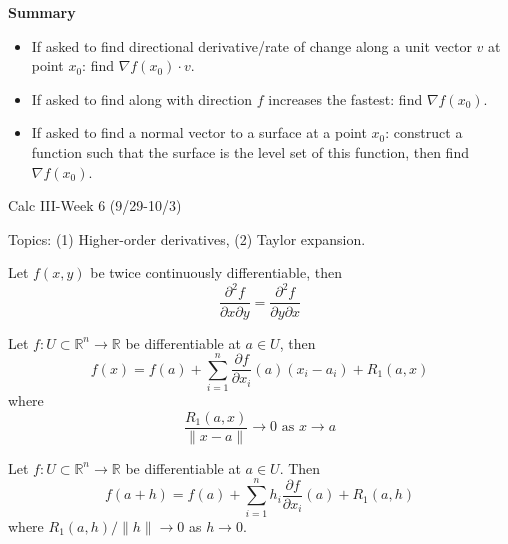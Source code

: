 \documentclass[openany]{book}
\newcommand{\R}{\mathbb{R}}
\begin{document}
\noindent 
\textbf{Summary}
\begin{itemize}
    \item If asked to find directional derivative/rate of change along a unit vector $v$ at point $x_0$: find $\nabla f(x_0)\cdot v$.
    \item If asked to find along with direction $f$ increases the fastest: find $\nabla f(x_0)$.
    \item If asked to find a normal vector to a surface at a point $x_0$: construct a function such that the surface is the level set of this function, then find $\nabla f(x_0)$.
\end{itemize}
 




\newpage 


\begin{center}
    \Large Calc III-Week 6 (9/29-10/3)
\end{center}

\renewcommand\thesection{\arabic{section}}

\noindent
Topics: (1) Higher-order derivatives, (2) Taylor expansion.


\begin{prop}
    Let $f(x,y)$ be twice continuously differentiable, then 
    \begin{equation*}
        \frac{\partial^2 f}{\partial x\partial y}=\frac{\partial^2 f}{\partial y\partial x}
    \end{equation*}
\end{prop}


\begin{defn}
    Let $f:U\subset\R^n\to\R$ be differentiable at $a\in U$, then 
    \begin{equation*}
        f(x)=f(a)+\sum_{i=1}^n\frac{\partial f}{\partial x_i}(a)(x_i-a_i)+R_1(a,x)
    \end{equation*}
    where 
    \begin{equation*}
        \frac{R_1(a,x)}{\|x-a\|}\to 0 \text{ as } x\to a
    \end{equation*}
\end{defn}

\begin{defn}
    Let $f:U\subset\R^n\to\R$ be differentiable at $a\in U$. Then 
    \begin{equation*}
        f(a+h)=f(a)+\sum_{i=1}^nh_i\frac{\partial f}{\partial x_i}(a)+R_1(a,h)
    \end{equation*}
    where $R_1(a,h)/\|h\|\to 0$ as $h\to 0$.
\end{defn}
\end{document}
